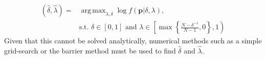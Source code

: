 \documentclass[11pt]{article}
\renewcommand{\P}{\mathbb{P}}
\DeclareMathOperator*{\argmax}{arg\,max}
\theoremstyle{definition}
\theoremstyle{definition}
\def\P{{\mathbb P}}
\begin{document}
\begin{align*}
\left(\hat{\delta}, \hat{\lambda}\right) =& \argmax_{\lambda, \delta} \log  f\left(\boldsymbol{p}| \delta, \lambda \right),\\
& \text{s.t. } \nonumber \delta \in [0,1] \text{ and } \lambda \in \left[  \max \left\{ \frac{N-\delta^{-1}}{N-1}, 0\right\}, 1 \right)
\end{align*}
Given that this cannot be solved analytically, numerical methods such as a simple grid-search or the barrier method must be used to find $\hat{\delta}$ and $\hat{\lambda}$. 

% 
\end{document}
